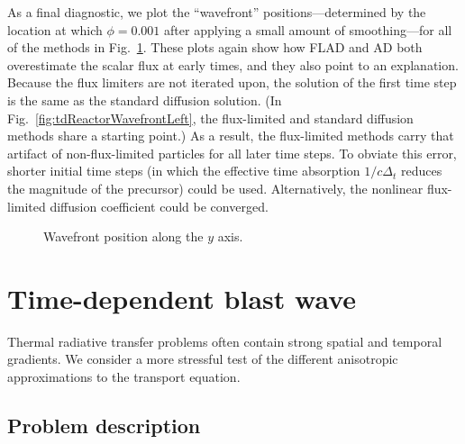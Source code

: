 \thesisclearpage

As a final diagnostic, we plot the ``wavefront'' positions---determined by the
location at which $\phi=0.001$ after applying a small amount of smoothing---for
all of the methods in Fig.~\ref{fig:tdReactorWavefront}. These plots again show
how FLAD and AD both overestimate the scalar flux at early times, and they also
point to an explanation. Because the flux limiters are not iterated upon, the
solution of the first time step is the same as the standard diffusion
solution. (In Fig.~\ref{fig:tdReactorWavefrontLeft}, the flux-limited and
standard diffusion methods share a starting point.) As a result, the
flux-limited methods carry that artifact of non-flux-limited particles for all
later time steps. To obviate this error, shorter initial time steps (in which
the effective time absorption $1/c\Delta_t$ reduces the magnitude of the
precursor) could be used. Alternatively, the nonlinear flux-limited diffusion
coefficient could be converged.

\begin{figure}[htb]
  \centering\small
  \hspace{.25in}%
  \subfloat[Channel, $x=2.5$]{%
    \hspace{-.25in}%
    }
  \subfloat[Medium, $x=0$]{%
    \label{fig:tdReactorWavefrontLeft}%
    \hspace{-.25in}%
    }
  \caption{Wavefront position along the $y$ axis.}
  \label{fig:tdReactorWavefront}
\end{figure}

\thesisclearpage

\section{Time-dependent blast wave}\label{sec:tdBlastwave}

Thermal radiative transfer problems often contain strong spatial and temporal
gradients. We consider a more stressful test of the different anisotropic
approximations to the transport equation.

\subsection{Problem description}

